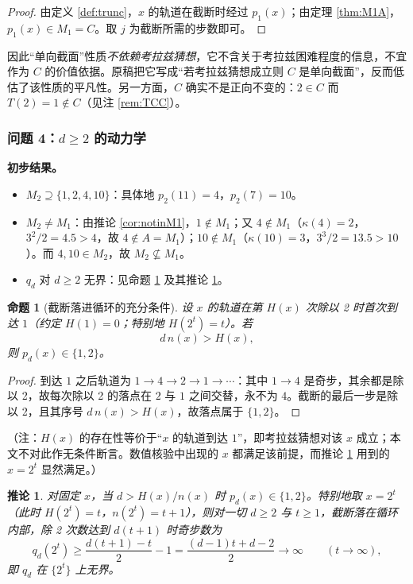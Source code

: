 \documentclass[11pt]{article}
\newtheorem{proposition}[theorem]{命题}
\newtheorem{corollary}[theorem]{推论}
\theoremstyle{definition}
\theoremstyle{definition}
\theoremstyle{remark}
\begin{document}
\begin{proof}
由定义 \ref{def:trunc}，\(x\) 的轨道在截断时经过 \(p_1(x)\)；由定理 \ref{thm:M1A}，\(p_1(x)\in M_1=C\)。取 \(j\) 为截断所需的步数即可。
\end{proof}

因此“单向截面”性质\emph{不依赖考拉兹猜想}，它不含关于考拉兹困难程度的信息，不宜作为 \(C\) 的价值依据。原稿把它写成“若考拉兹猜想成立则 \(C\) 是单向截面”，反而低估了该性质的平凡性。另一方面，\(C\) 确实不是正向不变的：\(2\in C\) 而 \(T(2)=1\notin C\)（见注 \ref{rem:TCC}）。

\subsubsection{问题 4：\(d\ge2\) 的动力学}

\textbf{初步结果。}
\begin{itemize}
\item \(M_2\supseteq\{1,2,4,10\}\)：具体地 \(p_2(11)=4\)，\(p_2(7)=10\)。
\item \(M_2\ne M_1\)：由推论 \ref{cor:notinM1}，\(1\notin M_1\)；又 \(4\notin M_1\)（\(\kappa(4)=2\)，\(3^2/2=4.5>4\)，故 \(4\notin A=M_1\)）；\(10\notin M_1\)（\(\kappa(10)=3\)，\(3^3/2=13.5>10\)）。而 \(4,10\in M_2\)，故 \(M_2\not\subseteq M_1\)。
\item \(q_d\) 对 \(d\ge2\) 无界：见命题 \ref{prop:cycle} 及其推论 \ref{cor:qunbounded}。
\end{itemize}

\begin{proposition}[截断落进循环的充分条件]\label{prop:cycle}
设 \(x\) 的轨道在第 \(H(x)\) 次除以 2 时首次到达 \(1\)（约定 \(H(1)=0\)；特别地 \(H(2^t)=t\)）。若
\[
d\,n(x)>H(x),
\]
则 \(p_d(x)\in\{1,2\}\)。
\end{proposition}

\begin{proof}
到达 \(1\) 之后轨道为 \(1\to4\to2\to1\to\cdots\)：其中 \(1\to4\) 是奇步，其余都是除以 2，故每次除以 2 的落点在 \(2\) 与 \(1\) 之间交替，永不为 \(4\)。截断的最后一步是除以 2，且其序号 \(d\,n(x)>H(x)\)，故落点属于 \(\{1,2\}\)。
\end{proof}

（注：\(H(x)\) 的存在性等价于“\(x\) 的轨道到达 \(1\)”，即考拉兹猜想对该 \(x\) 成立；本文不对此作无条件断言。数值核验中出现的 \(x\) 都满足该前提，而推论 \ref{cor:qunbounded} 用到的 \(x=2^t\) 显然满足。）

\begin{corollary}\label{cor:qunbounded}
对固定 \(x\)，当 \(d>H(x)/n(x)\) 时 \(p_d(x)\in\{1,2\}\)。特别地取 \(x=2^t\)（此时 \(H(2^t)=t\)，\(n(2^t)=t+1\)），则对一切 \(d\ge2\) 与 \(t\ge1\)，截断落在循环内部，除 2 次数达到 \(d(t+1)\) 时奇步数为
\[
q_d(2^t)\ge\frac{d(t+1)-t}{2}-1=\frac{(d-1)t+d-2}{2}\longrightarrow\infty\qquad(t\to\infty),
\]
即 \(q_d\) 在 \(\{2^t\}\) 上无界。
\end{corollary}
\end{document}
